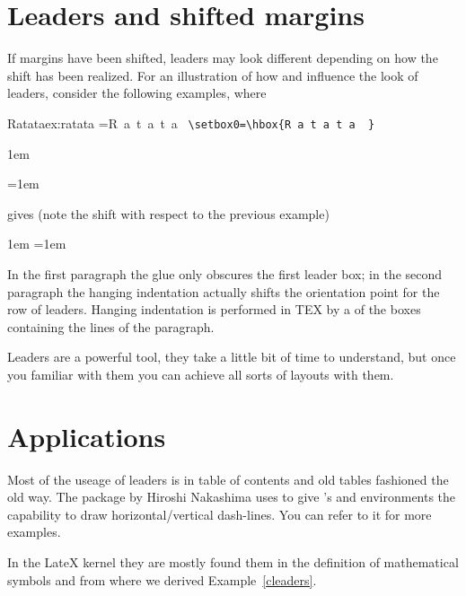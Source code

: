 \section{Leaders and shifted margins}

If margins have been shifted, leaders may look different depending on how the shift has been realized.
For an illustration of how and influence the look of leaders, consider
the following examples, where

\begin{texexample}{Ratata}{ex:ratata}
=\hbox{R a t a t a  }
\verb+\setbox0=\hbox{R a t a t a  }+



\hbox{\kern1em\hbox{\leaders{}\hskip5cm}}

\hangindent=1em  \noindent
\leaders{}\hskip5cm\hbox{}\par
\end{texexample}

gives (note the shift with respect to the previous example)
\medskip

{\hbox{\kern1em\hbox{\leaders{}\hskip5cm}}
\hangindent=1em  \noindent
\leaders{}\hskip5cm\hbox{}\par}

In the first paragraph the glue only obscures the first leader box; in the second paragraph
the hanging indentation actually shifts the orientation point for the row of leaders. Hanging
indentation is performed in TEX by a of the boxes containing the lines of the
paragraph.

   

Leaders are a powerful tool, they take a little bit of time to understand, but once you familiar with them you can achieve all sorts of layouts with them.


\section{Applications}

Most of the useage of leaders is in table of contents and old tables fashioned the old way. The package  by Hiroshi Nakashima uses  to give \latex’s  and  environments the capability to draw horizontal/vertical dash-lines. You can refer to it for more examples.

In the LateX kernel they are mostly found them in the definition of mathematical symbols and from where we derived Example~\ref{cleaders}.

